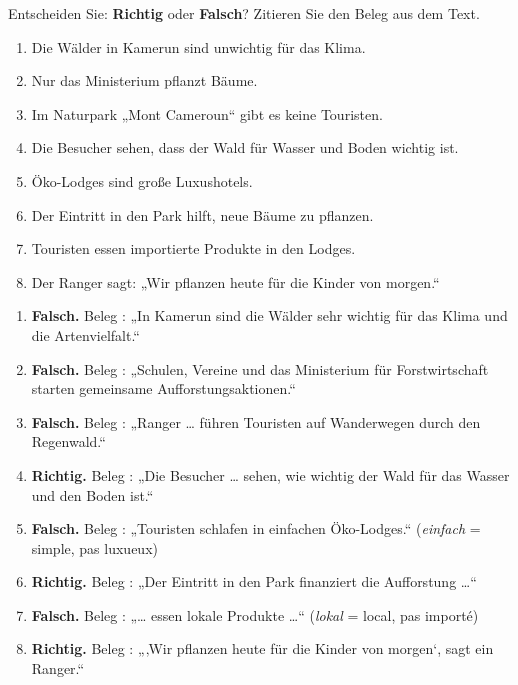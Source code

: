 \documentclass[11pt]{article}
\begin{document}
\begin{exercice}
Entscheiden Sie: \textbf{Richtig} oder \textbf{Falsch}? Zitieren Sie den Beleg aus dem Text.

\begin{enumerate}
    \item Die Wälder in Kamerun sind unwichtig für das Klima.
    \item Nur das Ministerium pflanzt Bäume.
    \item Im Naturpark „Mont Cameroun“ gibt es keine Touristen.
    \item Die Besucher sehen, dass der Wald für Wasser und Boden wichtig ist.
    \item Öko-Lodges sind große Luxushotels.
    \item Der Eintritt in den Park hilft, neue Bäume zu pflanzen.
    \item Touristen essen importierte Produkte in den Lodges.
    \item Der Ranger sagt: „Wir pflanzen heute für die Kinder von morgen.“
\end{enumerate}
\end{exercice}

\begin{corrige}
\begin{enumerate}
    \item \textbf{Falsch.} Beleg : „In Kamerun sind die Wälder sehr wichtig für das Klima und die Artenvielfalt.“
    \item \textbf{Falsch.} Beleg : „Schulen, Vereine und das Ministerium für Forstwirtschaft starten gemeinsame Aufforstungsaktionen.“
    \item \textbf{Falsch.} Beleg : „Ranger … führen Touristen auf Wanderwegen durch den Regenwald.“
    \item \textbf{Richtig.} Beleg : „Die Besucher … sehen, wie wichtig der Wald für das Wasser und den Boden ist.“
    \item \textbf{Falsch.} Beleg : „Touristen schlafen in einfachen Öko-Lodges.“ (\textit{einfach} = simple, pas luxueux)
    \item \textbf{Richtig.} Beleg : „Der Eintritt in den Park finanziert die Aufforstung …“
    \item \textbf{Falsch.} Beleg : „… essen lokale Produkte …“ (\textit{lokal} = local, pas importé)
    \item \textbf{Richtig.} Beleg : „‚Wir pflanzen heute für die Kinder von morgen‘, sagt ein Ranger.“
\end{enumerate}
\end{corrige}
\end{document}
